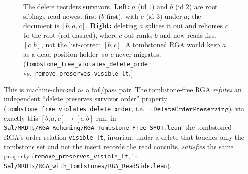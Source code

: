 \documentclass[11pt]{article}
\newcommand{\Del}{\mathsf{Del}}
\begin{document}
\begin{figure}[h]
\centering
{}
\caption{The delete reorders survivors. \textbf{Left:} $a$ (id $1$) and $b$ (id
$2$) are root siblings read newest-first ($b$ first), with $c$ (id $3$) under $a$;
the document is $[b,a,c]$. \textbf{Right:} deleting $a$ splices it out and rehomes
$c$ to the root (red dashed), where $c$ out-ranks $b$ and now reads first ---
$[c,b]$, not the list-correct $[b,c]$. A tombstoned RGA would keep $a$ as a dead
position-holder, so $c$ never migrates.
(\texttt{tombstone\_free\_violates\_delete\_order} vs.\
\texttt{remove\_preserves\_visible\_lt}.)}
\label{fig:reorder}
\end{figure}

This is machine-checked as a fail/pass pair. The tombstone-free RGA
\emph{refutes} an independent ``delete preserves survivor order'' property
(\texttt{tombstone\_free\_violates\_delete\_order}, i.e.\
$\neg\,\texttt{DeleteOrderPreserving}$), via exactly this $[b,a,c]\to[c,b]$ run,
in \texttt{Sal/MRDTs/RGA\_Rehoming/RGA\_Tombstone\_Free\_SPOT.lean}; the tombstoned RGA's
order relation \texttt{visible\_lt}, invariant under a delete that touches only the
tombstone set and not the insert records the read consults, \emph{satisfies} the
same property (\texttt{remove\_preserves\_visible\_lt}, in
\texttt{Sal/MRDTs/RGA\_with\_tombstones/RGA\_ReadSide.lean}).
\end{document}
